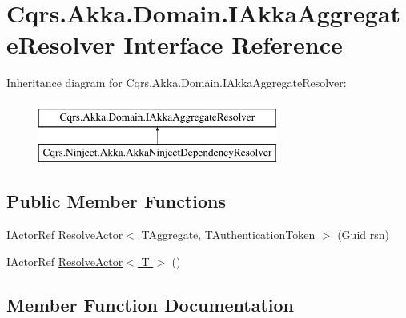\hypertarget{interfaceCqrs_1_1Akka_1_1Domain_1_1IAkkaAggregateResolver}{}\section{Cqrs.\+Akka.\+Domain.\+I\+Akka\+Aggregate\+Resolver Interface Reference}
\label{interfaceCqrs_1_1Akka_1_1Domain_1_1IAkkaAggregateResolver}
Inheritance diagram for Cqrs.\+Akka.\+Domain.\+I\+Akka\+Aggregate\+Resolver\+:\begin{figure}[H]
\begin{center}
\leavevmode
\includegraphics[height=2.000000cm]{interfaceCqrs_1_1Akka_1_1Domain_1_1IAkkaAggregateResolver}
\end{center}
\end{figure}
\subsection*{Public Member Functions}
\begin{DoxyCompactItemize}
\item 
I\+Actor\+Ref \hyperlink{interfaceCqrs_1_1Akka_1_1Domain_1_1IAkkaAggregateResolver_a59dbc788ce9893d72684ff5c18945c1d_a59dbc788ce9893d72684ff5c18945c1d}{Resolve\+Actor$<$ T\+Aggregate, T\+Authentication\+Token $>$} (Guid rsn)
\item 
I\+Actor\+Ref \hyperlink{interfaceCqrs_1_1Akka_1_1Domain_1_1IAkkaAggregateResolver_a9c3e3f9e8a963ea0b11e79f9eb1c55a9_a9c3e3f9e8a963ea0b11e79f9eb1c55a9}{Resolve\+Actor$<$ T $>$} ()
\end{DoxyCompactItemize}


\subsection{Member Function Documentation}
\mbox{\label{interfaceCqrs_1_1Akka_1_1Domain_1_1IAkkaAggregateResolver_a9c3e3f9e8a963ea0b11e79f9eb1c55a9_a9c3e3f9e8a963ea0b11e79f9eb1c55a9}} 

